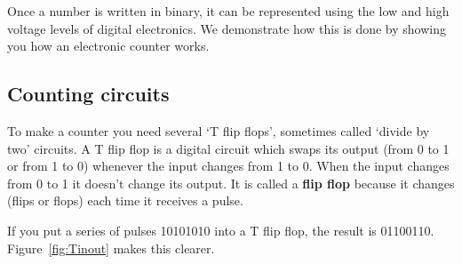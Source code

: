 %

Once a number is written in binary, it can be represented using the low and high voltage levels of digital electronics.  We demonstrate how this is done by showing you how an electronic counter works.

\subsection{Counting circuits}

To make a counter you need several `T flip flops', sometimes called `divide by two' circuits.  A T flip flop is a digital circuit which swaps its output (from 0 to 1 or from 1 to 0) whenever the input changes from 1 to 0.  When the input changes from 0 to 1 it doesn't change its output.  It is called a {\bf flip flop} because it changes (flips or flops) each time it receives a pulse.

If you put a series of pulses 10101010 into a T flip flop, the result is 01100110.  Figure~\ref{fig:Tinout} makes this clearer.

